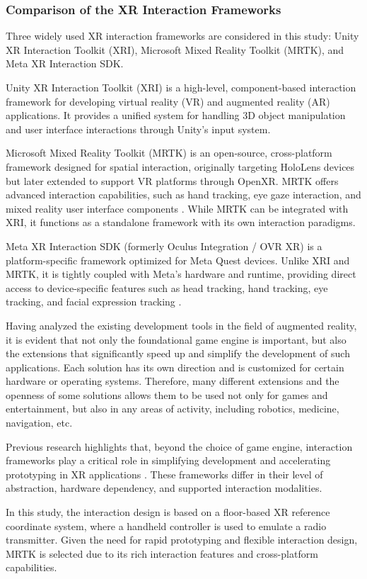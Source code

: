 \subsubsection{Comparison of the XR Interaction Frameworks}

Three widely used XR interaction frameworks are considered in this study: Unity XR Interaction Toolkit (XRI), Microsoft Mixed Reality Toolkit (MRTK), and Meta XR Interaction SDK.

Unity XR Interaction Toolkit (XRI) is a high-level, component-based interaction framework for developing virtual reality (VR) and augmented reality (AR) applications. It provides a unified system for handling 3D object manipulation and user interface interactions through Unity's input system.

Microsoft Mixed Reality Toolkit (MRTK) is an open-source, cross-platform framework designed for spatial interaction, originally targeting HoloLens devices but later extended to support VR platforms through OpenXR. MRTK offers advanced interaction capabilities, such as hand tracking, eye gaze interaction, and mixed reality user interface components \parencite{dojcinovic_personalized_2026}. While MRTK can be integrated with XRI, it functions as a standalone framework with its own interaction paradigms.

Meta XR Interaction SDK (formerly Oculus Integration / OVR XR) is a platform-specific framework optimized for Meta Quest devices. Unlike XRI and MRTK, it is tightly coupled with Meta's hardware and runtime, providing direct access to device-specific features such as head tracking, hand tracking, eye tracking, and facial expression tracking \parencite{wang_xr-dt_2026}.
 
Having analyzed the existing development tools in the field of augmented reality, it is evident that not only the foundational game engine is important, but also the extensions that significantly speed up and simplify the development of such applications. Each solution has its own direction and is customized for certain hardware or operating systems. Therefore, many different extensions and the openness of some solutions allows them to be used not only for games and entertainment, but also in any areas of activity, including robotics, medicine, navigation, etc. \parencite{shatokhin_extended_2025}

Previous research highlights that, beyond the choice of game engine, interaction frameworks play a critical role in simplifying development and accelerating prototyping in XR applications \parencite{shatokhin_extended_2025}. These frameworks differ in their level of abstraction, hardware dependency, and supported interaction modalities.

In this study, the interaction design is based on a floor-based XR reference coordinate system, where a handheld controller is used to emulate a radio transmitter. Given the need for rapid prototyping and flexible interaction design, MRTK is selected due to its rich interaction features and cross-platform capabilities.